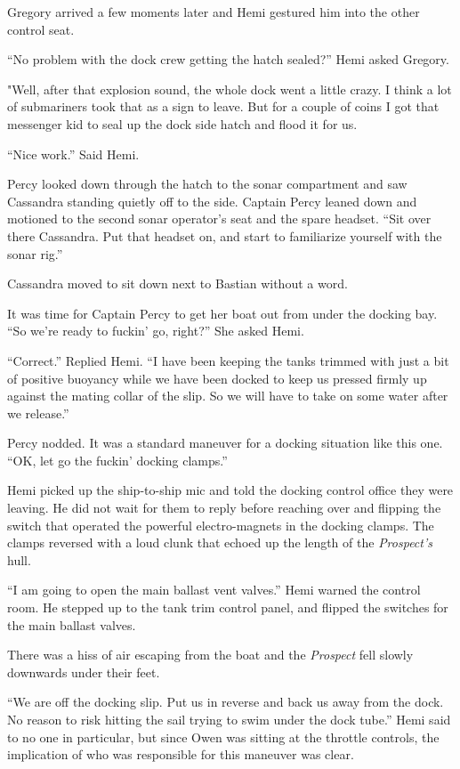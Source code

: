 \documentclass[]{scrbook}
\begin{document}
Gregory arrived a few moments later and Hemi gestured him into the other
control seat.

``No problem with the dock crew getting the hatch sealed?'' Hemi asked
Gregory.

"Well, after that explosion sound, the whole dock went a little crazy. I
think a lot of submariners took that as a sign to leave. But for a
couple of coins I got that messenger kid to seal up the dock side hatch
and flood it for us.

``Nice work.'' Said Hemi.

Percy looked down through the hatch to the sonar compartment and saw
Cassandra standing quietly off to the side. Captain Percy leaned down
and motioned to the second sonar operator's seat and the spare headset.
``Sit over there Cassandra. Put that headset on, and start to
familiarize yourself with the sonar rig.''

Cassandra moved to sit down next to Bastian without a word.

It was time for Captain Percy to get her boat out from under the docking
bay. ``So we're ready to fuckin' go, right?'' She asked Hemi.

``Correct.'' Replied Hemi. ``I have been keeping the tanks trimmed with
just a bit of positive buoyancy while we have been docked to keep us
pressed firmly up against the mating collar of the slip. So we will have
to take on some water after we release.''

Percy nodded. It was a standard maneuver for a docking situation like
this one. ``OK, let go the fuckin' docking clamps.''

Hemi picked up the ship-to-ship mic and told the docking control office
they were leaving. He did not wait for them to reply before reaching
over and flipping the switch that operated the powerful electro-magnets
in the docking clamps. The clamps reversed with a loud clunk that echoed
up the length of the \emph{Prospect's} hull.

``I am going to open the main ballast vent valves.'' Hemi warned the
control room. He stepped up to the tank trim control panel, and flipped
the switches for the main ballast valves.

There was a hiss of air escaping from the boat and the \emph{Prospect}
fell slowly downwards under their feet.

``We are off the docking slip. Put us in reverse and back us away from
the dock. No reason to risk hitting the sail trying to swim under the
dock tube.'' Hemi said to no one in particular, but since Owen was
sitting at the throttle controls, the implication of who was responsible
for this maneuver was clear.
\end{document}
